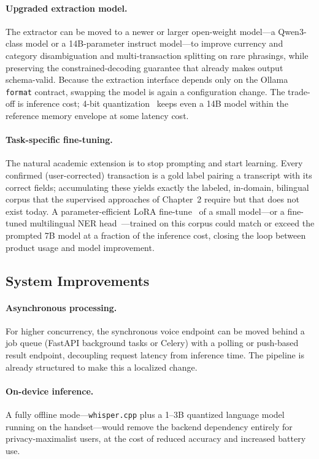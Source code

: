 \paragraph{Upgraded extraction model.} The extractor can be moved to a newer or
larger open-weight model---a Qwen3-class model or a 14B-parameter instruct model---to
improve currency and category disambiguation and multi-transaction splitting on
rare phrasings, while preserving the constrained-decoding guarantee that already
makes output schema-valid. Because the extraction interface depends only on the
Ollama \texttt{format} contract, swapping the model is again a configuration
change. The trade-off is inference cost; 4-bit quantization~\cite{frantar2023gptq}
keeps even a 14B model within the reference memory envelope at some latency cost.

\paragraph{Task-specific fine-tuning.} The natural academic extension is to stop
prompting and start learning. Every confirmed (user-corrected) transaction is a
gold label pairing a transcript with its correct fields; accumulating these yields
exactly the labeled, in-domain, bilingual corpus that the supervised approaches of
Chapter~2 require but that does not exist today. A parameter-efficient LoRA
fine-tune~\cite{hu2022lora} of a small model---or a fine-tuned multilingual NER
head~\cite{antoun2020arabert,lample2016ner}---trained on this corpus could match or
exceed the prompted 7B model at a fraction of the inference cost, closing the loop
between product usage and model improvement.

\subsection{System Improvements}

\paragraph{Asynchronous processing.} For higher concurrency, the synchronous
voice endpoint can be moved behind a job queue (FastAPI background tasks or
Celery) with a polling or push-based result endpoint, decoupling request latency
from inference time. The pipeline is already structured to make this a
localized change.

\paragraph{On-device inference.} A fully offline mode---\texttt{whisper.cpp} plus a
1--3B quantized language model running on the handset---would remove the backend
dependency entirely for privacy-maximalist users, at the cost of reduced accuracy
and increased battery use.

